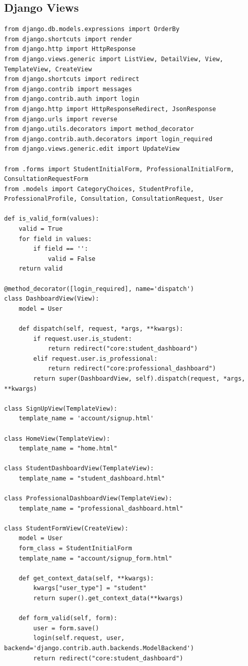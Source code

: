 \documentclass{article}
\begin{document}
	\subsection{Django Views}
	\begin{verbatim}
from django.db.models.expressions import OrderBy
from django.shortcuts import render
from django.http import HttpResponse
from django.views.generic import ListView, DetailView, View, TemplateView, CreateView
from django.shortcuts import redirect
from django.contrib import messages
from django.contrib.auth import login
from django.http import HttpResponseRedirect, JsonResponse
from django.urls import reverse
from django.utils.decorators import method_decorator
from django.contrib.auth.decorators import login_required
from django.views.generic.edit import UpdateView

from .forms import StudentInitialForm, ProfessionalInitialForm, ConsultationRequestForm
from .models import CategoryChoices, StudentProfile, ProfessionalProfile, Consultation, ConsultationRequest, User

def is_valid_form(values):
	valid = True
	for field in values:
		if field == '':
			valid = False
	return valid

@method_decorator([login_required], name='dispatch')
class DashboardView(View):
	model = User

	def dispatch(self, request, *args, **kwargs):
		if request.user.is_student:
			return redirect("core:student_dashboard")
		elif request.user.is_professional:
			return redirect("core:professional_dashboard")
		return super(DashboardView, self).dispatch(request, *args, **kwargs)

class SignUpView(TemplateView):
	template_name = 'account/signup.html'

class HomeView(TemplateView):
	template_name = "home.html"

class StudentDashboardView(TemplateView):
	template_name = "student_dashboard.html"

class ProfessionalDashboardView(TemplateView):
	template_name = "professional_dashboard.html"

class StudentFormView(CreateView):
	model = User
	form_class = StudentInitialForm
	template_name = "account/signup_form.html"
	
	def get_context_data(self, **kwargs):
		kwargs["user_type"] = "student"
		return super().get_context_data(**kwargs)

	def form_valid(self, form):
		user = form.save()
		login(self.request, user, backend='django.contrib.auth.backends.ModelBackend')
		return redirect("core:student_dashboard")


\end{verbatim}
\end{document}
